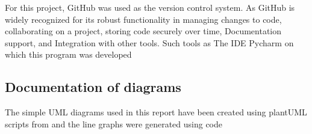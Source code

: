 For this project, GitHub was used as the version control system.
As GitHub is widely recognized for its robust functionality in managing changes to code, collaborating on a project, storing code securely
 over time, Documentation support, and Integration with other tools.
Such tools as The IDE Pycharm on which this program was developed

\subsection{Documentation of diagrams}\label{subsec:documentation-of-diagrams}
The simple UML diagrams used in this report have been created using plantUML scripts from  \cite{planttext.com} and the line graphs
were generated using code










